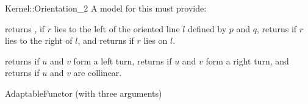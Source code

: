 \begin{ccRefFunctionObjectConcept}{Kernel::Orientation_2}
A model for this must provide:


{returns , if $r$ lies to the left of the oriented 
line $l$ defined by $p$ and $q$, returns  if $r$ 
lies to the right of $l$, and returns  if $r$ lies
on $l$.}

{returns  if $u$ and $v$ form a left turn,
returns  if $u$ and $v$ form a right turn,
and returns  if $u$ and $v$ are collinear.}

\ccRefines
AdaptableFunctor (with three arguments)

\ccSeeAlso
{}\\

\end{ccRefFunctionObjectConcept}
